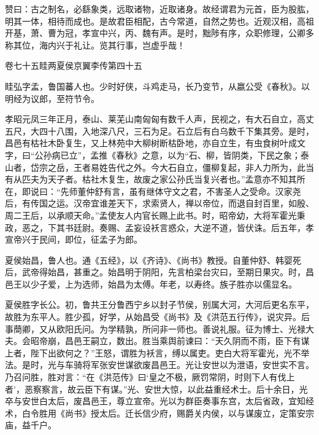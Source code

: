 \documentclass[12pt,UTF8]{ctexbook}
\begin{document}
赞曰：古之制名，必繇象类，远取诸物，近取诸身。故经谓君为元首，臣为股肱，明其一体，相待而成也。是故君臣相配，古今常道，自然之势也。近观汉相，高祖开基，萧、曹为冠，孝宣中兴，丙、魏有声。是时，黜陟有序，众职修理，公卿多称其位，海内兴于礼让。览其行事，岂虚乎哉！





卷七十五眭两夏侯京翼李传第四十五



眭弘字孟，鲁国蕃人也。少时好侠，斗鸡走马，长乃变节，从嬴公受《春秋》。以明经为议郎，至符节令。



孝昭元凤三年正月，泰山、莱芜山南匈匈有数千人声，民视之，有大石自立，高丈五尺，大四十八围，入地深八尺，三石为足。石立后有白乌数千下集其旁。是时，昌邑有枯社木卧复生，又上林苑中大柳树断枯卧地，亦自立生，有虫食树叶成文字，曰“公孙病已立”，孟推《春秋》之意，以为“石、柳，皆阴类，下民之象；泰山者，岱宗之岳，王者易姓告代之外。今大石自立，僵柳复起，非人力所为，此当有从匹夫为天子者。枯社木复生，故废之家公孙氏当复兴者也。”孟意亦不知其所在，即说曰：“先师董仲舒有言，虽有继体守文之君，不害圣人之受命。汉家尧后，有传国之运。汉帝宜谁差天下，求索贤人，禅以帝位，而退自封百里，如殷、周二王后，以承顺天命。”孟使友人内官长赐上此书。时，昭帝幼，大将军霍光秉政，恶之，下其书廷尉。奏赐、孟妄设袄言惑众，大逆不道，皆伏诛。后五年，孝宣帝兴于民间，即位，征孟子为郎。



夏侯始昌，鲁人也。通《五经》，以《齐诗》、《尚书》教授。自董仲舒、韩婴死后，武帝得始昌，甚重之。始昌明于阴阳，先言柏梁台灾曰，至期日果灾。时，昌邑王以少子爱，上为选师，始昌为太傅。年老，以寿终。族子胜亦以儒显名。



夏侯胜字长公。初，鲁共王分鲁西宁乡以封子节侯，别属大河，大河后更名东平，故胜为东平人。胜少孤，好学，从始昌受《尚书》及《洪范五行传》，说灾异。后事蕳卿，又从欧阳氏问。为学精孰，所问非一师也。善说礼服。征为博士、光禄大夫。会昭帝崩，昌邑王嗣立，数出。胜当乘舆前谏曰：“天久阴而不雨，臣下有谋上者，陛下出欲何之？”王怒，谓胜为袄言，缚以属吏。吏白大将军霍光，光不举法。是时，光与车骑将军张安世谋欲废昌邑王。光让安世以为泄语，安世实不言。乃召问胜，胜对言：“在《洪范传》曰‘皇之不极，厥罚常阴，时则下人有伐上者’，恶察察言，故云臣下有谋。”光、安世大惊，以此益重经术士。后十余日，光卒与安世白太后，废昌邑王，尊立宣帝。光以为群臣奏事东宫，太后省政，宜知经术，白令胜用《尚书》授太后。迁长信少府，赐爵关内侯，以与谋废立，定策安宗庙，益千户。
\end{document}
